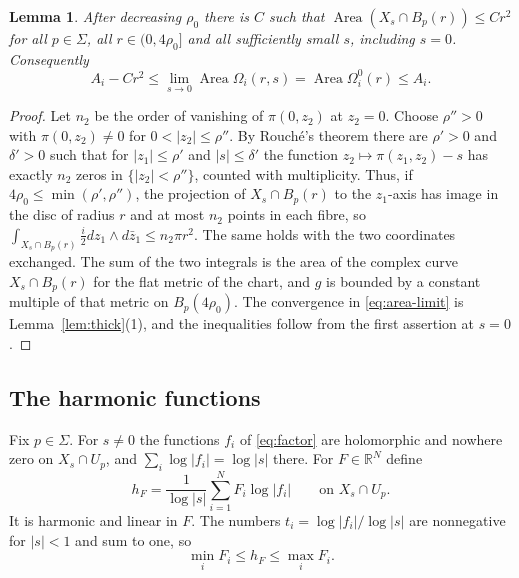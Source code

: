 \documentclass[11pt]{amsart}
\newtheorem{lemma}[theorem]{Lemma}
\theoremstyle{definition}
\theoremstyle{remark}
\newcommand{\RR}{\mathbb R}
\newcommand{\area}{\operatorname{Area}}
\begin{document}
\begin{lemma}\label{lem:area}
After decreasing $\rho_0$ there is $C$ such that
$\area(X_s\cap B_p(r))\le Cr^2$ for all $p\in\Sigma$, all
$r\in(0,4\rho_0]$ and all sufficiently small $s$, including $s=0$.
Consequently
\begin{equation}\label{eq:area-limit}
 A_i-Cr^2\le\lim_{s\to0}\area\Omega_i(r,s)=\area\Omega^0_i(r)\le A_i .
\end{equation}
\end{lemma}
\begin{proof}
Let $n_2$ be the order of vanishing of $\pi(0,z_2)$ at $z_2=0$. Choose
$\rho''>0$ with $\pi(0,z_2)\ne0$ for $0<|z_2|\le\rho''$. By Rouch\'e's
theorem there are $\rho'>0$ and $\delta'>0$ such that for $|z_1|\le\rho'$
and $|s|\le\delta'$ the function $z_2\mapsto\pi(z_1,z_2)-s$ has exactly
$n_2$ zeros in $\{|z_2|<\rho''\}$, counted with multiplicity. Thus, if
$4\rho_0\le\min(\rho',\rho'')$, the projection of $X_s\cap B_p(r)$ to the
$z_1$-axis has image in the disc of radius $r$ and at most $n_2$ points in
each fibre, so
$\int_{X_s\cap B_p(r)}\tfrac i2dz_1\wedge d\bar z_1\le n_2\pi r^2$.
The same holds with the two coordinates exchanged. The sum of the two
integrals is the area of the complex curve $X_s\cap B_p(r)$ for the flat
metric of the chart, and $g$ is bounded by a constant multiple of that
metric on $B_p(4\rho_0)$. The convergence in \eqref{eq:area-limit} is
Lemma~\ref{lem:thick}(1), and the inequalities follow from the first
assertion at $s=0$.
\end{proof}

\subsection{The harmonic functions}
Fix $p\in\Sigma$. For $s\ne0$ the functions $f_i$ of \eqref{eq:factor} are
holomorphic and nowhere zero on $X_s\cap U_p$, and
$\sum_i\log|f_i|=\log|s|$ there. For $F\in\RR^N$ define
\begin{equation}\label{eq:hF}
 h_F=\frac1{\log|s|}\sum_{i=1}^NF_i\log|f_i|
 \qquad\text{on }X_s\cap U_p .
\end{equation}
It is harmonic and linear in $F$. The numbers
$t_i=\log|f_i|/\log|s|$ are nonnegative for $|s|<1$ and sum to one, so
\begin{equation}\label{eq:hF-bounds}
 \min_iF_i\le h_F\le\max_iF_i .
\end{equation}
\end{document}
